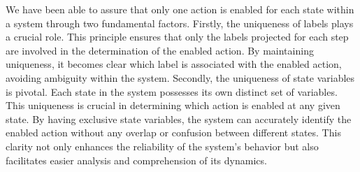 We have been able to assure that only one action is enabled for each state within a system through two fundamental factors. Firstly, the uniqueness of labels plays a crucial role. This principle ensures that only the labels projected for each step are involved in the determination of the enabled action. By maintaining uniqueness, it becomes clear which label is associated with the enabled action, avoiding ambiguity within the system.
Secondly, the uniqueness of state variables is pivotal. Each state in the system possesses its own distinct set of variables. This uniqueness is crucial in determining which action is enabled at any given state. By having exclusive state variables, the system can accurately identify the enabled action without any overlap or confusion between different states. This clarity not only enhances the reliability of the system's behavior but also facilitates easier analysis and comprehension of its dynamics.